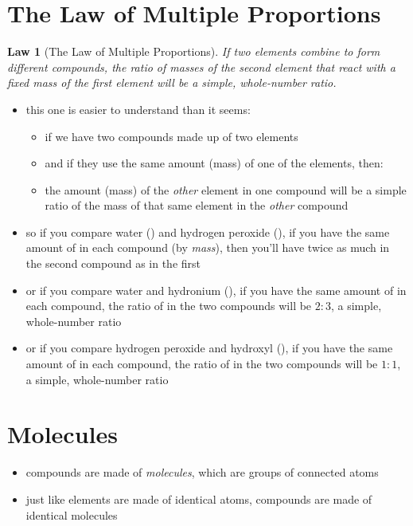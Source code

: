 \documentclass[11pt, oneside]{article}   	%
\newtheorem{law}{Law}
\begin{document}
\section{The Law of Multiple Proportions}

\begin{law}[The Law of Multiple Proportions]\label{law-multiple-proportions}
If two elements combine to form different compounds, the ratio of masses of the \emph{second} element that react with a fixed mass of the \emph{first} element 
will be a simple, whole-number ratio.
\end{law}

\begin{itemize}
\item this one is easier to understand than it seems:
\begin{itemize}
\item if we have two compounds made up of two elements
\item and if they use the same amount (mass) of one of the elements, then:
\item the amount (mass) of the \emph{other} element in one compound will be a simple ratio of the mass of that same element in the \emph{other} compound
\end{itemize}
\item so if you compare water () and hydrogen peroxide (), if you have the same amount of  in each compound (by \emph{mass}), then you'll have twice as much  in the second compound as in the first
\item or if you compare water and hydronium (), if you have the same amount of  in each compound, the ratio of  in the two compounds will be $2:3$, a simple, whole-number ratio 
\item or if you compare hydrogen peroxide and hydroxyl (), if you have the same amount of  in each compound, the ratio of  in the two compounds will be $1:1$, a simple, whole-number ratio 
\end{itemize}

\section{Molecules}
\begin{itemize}
\item compounds are made of \emph{molecules}, which are groups of connected atoms
\item just like elements are made of identical atoms, compounds are made of identical molecules
\end{itemize}
\end{document}
